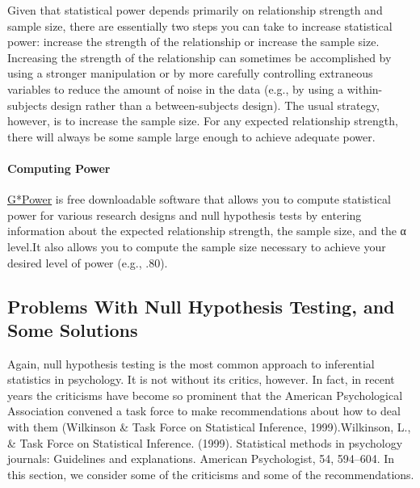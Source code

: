 \documentclass[
]{krantz}
\begin{document}
Given that statistical power depends primarily on relationship strength and sample size, there are essentially two steps you can take to increase statistical power: increase the strength of the relationship or increase the sample size. Increasing the strength of the relationship can sometimes be accomplished by using a stronger manipulation or by more carefully controlling extraneous variables to reduce the amount of noise in the data (e.g., by using a within-subjects design rather than a between-subjects design). The usual strategy, however, is to increase the sample size. For any expected relationship strength, there will always be some sample large enough to achieve adequate power.

\hypertarget{computing-power}{%
\paragraph*{Computing Power}\label{computing-power}}

\href{https://www.psychologie.hhu.de/arbeitsgruppen/allgemeine-psychologie-und-arbeitspsychologie/gpower}{G*Power} is free downloadable software that allows you to compute statistical power for various research designs and null hypothesis tests by entering information about the expected relationship strength, the sample size, and the α level.It also allows you to compute the sample size necessary to achieve your desired level of power (e.g., .80).

\hypertarget{problems-with-null-hypothesis-testing-and-some-solutions}{%
\subsection*{Problems With Null Hypothesis Testing, and Some Solutions}\label{problems-with-null-hypothesis-testing-and-some-solutions}}


Again, null hypothesis testing is the most common approach to inferential statistics in psychology. It is not without its critics, however. In fact, in recent years the criticisms have become so prominent that the American Psychological Association convened a task force to make recommendations about how to deal with them (Wilkinson \& Task Force on Statistical Inference, 1999).Wilkinson, L., \& Task Force on Statistical Inference. (1999). Statistical methods in psychology journals: Guidelines and explanations. American Psychologist, 54, 594--604. In this section, we consider some of the criticisms and some of the recommendations.
\end{document}
